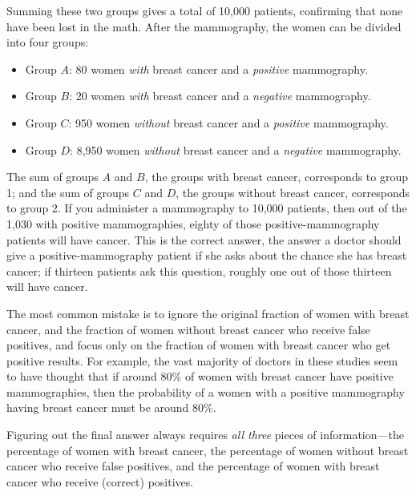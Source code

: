 {
 Summing these two groups gives a total of 10,000 patients,
confirming that none have been lost in the math. After the mammography,
the women can be divided into four groups:}


\begin{itemize}
\item{
 Group $A$: 80 women \textit{with} breast cancer and a
\textit{positive} mammography.}

\item{
 Group $B$: 20 women \textit{with} breast cancer and a
\textit{negative} mammography.}

\item{
 Group $C$: 950 women \textit{without} breast cancer and a
\textit{positive} mammography.}

\item {
 Group $D$: 8,950 women \textit{without} breast cancer and a
 \textit{negative} mammography.}
\end{itemize}

{
 The sum of groups $A$ and $B$, the groups with breast cancer,
corresponds to group 1; and the sum of groups $C$ and $D$, the groups
without breast cancer, corresponds to group 2. If you administer a
mammography to 10,000 patients, then out of the 1,030 with positive
mammographies, eighty of those positive-mammography patients will have
cancer. This is the correct answer, the answer a doctor should give a
positive-mammography patient if she asks about the chance she has
breast cancer; if thirteen patients ask this question, roughly one out
of those thirteen will have cancer.}

\hr

{
 The most common mistake is to ignore the original fraction of
women with breast cancer, and the fraction of women without breast
cancer who receive false positives, and focus only on the fraction of
women with breast cancer who get positive results. For example, the
vast majority of doctors in these studies seem to have thought that if
around 80\% of women with breast cancer have positive mammographies,
then the probability of a women with a positive mammography having
breast cancer must be around 80\%.}

{
 Figuring out the final answer always requires \textit{all three}
pieces of information---the percentage of women with breast cancer, the
percentage of women without breast cancer who receive false positives,
and the percentage of women with breast cancer who receive (correct)
positives.}

